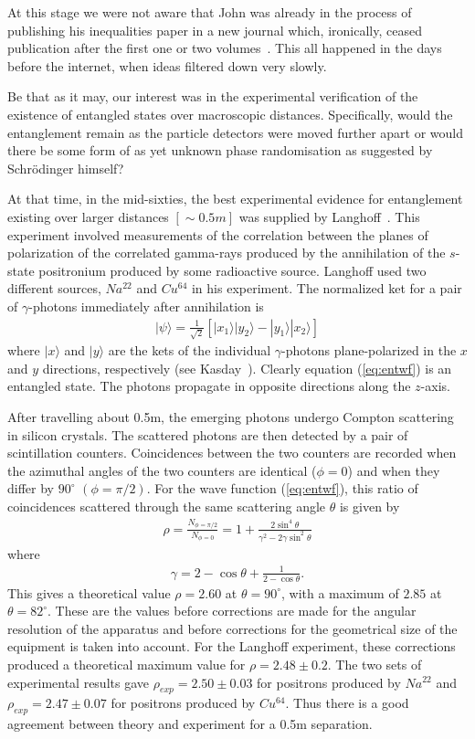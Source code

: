 \documentclass[11pt]{article}
\begin{document}
At this stage we were not aware that John was already in the process of publishing his inequalities paper in a new journal which, ironically, ceased publication after the first one or two volumes~\cite{jb64}.
This all happened in the days before the internet, when ideas filtered down very slowly. 

Be that as it may, our interest was in the experimental verification of the existence of entangled states over macroscopic distances.  Specifically, would the entanglement remain as the particle detectors were moved further apart or would there be some form of as yet unknown phase randomisation as suggested by Schr\"{o}dinger himself? 

At that time, in the mid-sixties, the best experimental evidence for entanglement existing over larger distances $[\sim 0.5m]$ was supplied by Langhoff~\cite{hl60}.
This experiment involved measurements of the correlation between the planes of polarization of the correlated gamma-rays produced by the annihilation of the $s$-state positronium produced by some radioactive source.  Langhoff used two different sources, $Na^{22}$ and $Cu^{64}$ in his experiment. The normalized ket for a pair of $\gamma$-photons immediately after annihilation is
\begin{eqnarray}
|\psi\rangle=\frac{1}{\sqrt 2}\left [ |x_1\rangle|y_2\rangle- |y_1\rangle|x_2\rangle\right]		\label{eq:entwf}
\end{eqnarray}
where $|x\rangle$ and $|y\rangle$ are the kets of the individual $\gamma$-photons plane-polarized in the $x$ and $y$ directions, respectively (see Kasday~\cite{lk71}).   Clearly equation (\ref{eq:entwf})  is an entangled state.  The photons propagate in opposite directions along the $z$-axis.


After travelling about 0.5m, the emerging photons undergo Compton scattering in silicon crystals.  The scattered photons are then detected by a pair of scintillation counters.  Coincidences  between the two counters are recorded when the azimuthal angles of the two counters are identical ($\phi=0$) and when they differ by $90^{\circ}$ $(\phi=\pi/2)$.  For the wave function (\ref{eq:entwf}), this ratio of coincidences scattered through the same scattering angle $\theta$ is given by 
\begin{eqnarray}
\rho=\frac{N_{\phi=\pi/2}}{N_{\phi=0}}=1+\frac{2\sin^4\theta}{\gamma^2-2\gamma\sin^2\theta}	\label{eq:anisot}
\end{eqnarray}
where
\begin{eqnarray*}
\gamma=2-\cos\theta+\frac{1}{2-\cos\theta}.
\end{eqnarray*}
This gives a theoretical value $\rho=2.60$ at $\theta=90^{\circ}$, with a maximum of $2.85$ at $\theta=82^{\circ}$.  These are the values before corrections are made for the angular resolution of the apparatus and before corrections for the geometrical size of the equipment is taken into account. For the Langhoff experiment, these corrections produced a theoretical maximum value for $\rho=2.48\pm0.2$.  The two sets of experimental results gave $\rho_{exp}=2.50\pm0.03$ for positrons produced by $Na^{22}$ and $\rho_{exp}=2.47\pm0.07$ for positrons produced by $Cu^{64}$.  Thus there is a good agreement between theory and experiment for a 0.5m separation. 
\end{document}
